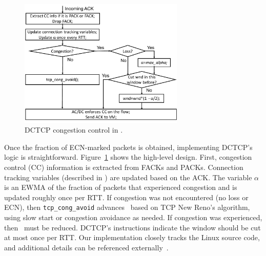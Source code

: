 \begin{figure}[!t]
        \centering
  \includegraphics[width=0.7\textwidth]{acdctcp/figures/acdc_cc.pdf}
        \caption{DCTCP congestion control in \acdc{}.}
        \label{acdc_cc}
\end{figure}
Once the fraction of ECN-marked packets is obtained, implementing DCTCP's logic is straightforward.
Figure~\ref{acdc_cc} shows the high-level design. 
First, congestion control (CC) information is extracted from FACKs and PACKs. Connection tracking
variables (described in ) are updated based on the ACK. The variable
$\alpha$ is an EWMA of the fraction of packets that experienced congestion and is updated roughly
once per RTT. If congestion was not encountered (no loss or ECN), then {\tt tcp\_cong\_avoid} advances~\cwnd{}
based on TCP New Reno's algorithm, using slow start or congestion avoidance as needed. If congestion was
experienced, then~\cwnd{} must be reduced. DCTCP's instructions indicate the window should
be cut at most once per RTT.
Our implementation closely tracks the Linux source code, and
additional details can be referenced externally~\cite{dctcp,ietf-tcpm-dctcp}.



